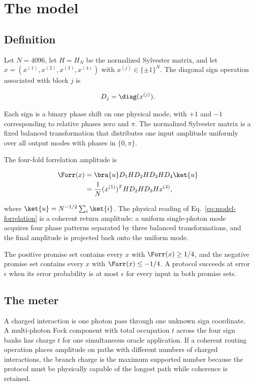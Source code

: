 \section{The model}
\label{sec:model}

\subsection{Definition}

Let $N=4096$, let $H=H_N$ be the normalized Sylvester matrix, and let $x=(x^{(1)},x^{(2)},x^{(3)},x^{(4)})$ with $x^{(j)}\in\{\pm1\}^N$. The diagonal sign operation associated with block $j$ is

\begin{equation}
D_j=\diag(x^{(j)}).
\end{equation}

Each sign is a binary phase shift on one physical mode, with $+1$ and $-1$ corresponding to relative phases zero and $\pi$. The normalized Sylvester matrix is a fixed balanced transformation that distributes one input amplitude uniformly over all output modes with phases in $\{0,\pi\}$.

The four-fold forrelation amplitude is

\begin{align}
\Forr(x)
&=\bra{u}D_1HD_2HD_3HD_4\ket{u}
\notag\\
&=\frac{1}{N}(x^{(1)})^THD_2HD_3Hx^{(4)},
\label{eq:model-forrelation}
\end{align}

where $\ket{u}=N^{-1/2}\sum_i\ket{i}$. The physical reading of Eq.~\eqref{eq:model-forrelation} is a coherent return amplitude: a uniform single-photon mode acquires four phase patterns separated by three balanced transformations, and the final amplitude is projected back onto the uniform mode.

\begin{definition}[Promise]
The positive promise set contains every $x$ with $\Forr(x)\ge1/4$, and the negative promise set contains every $x$ with $\Forr(x)\le-1/4$. A protocol succeeds at error $\epsilon$ when its error probability is at most $\epsilon$ for every input in both promise sets.
\end{definition}

\subsection{The meter}

A charged interaction is one photon pass through one unknown sign coordinate. A multi-photon Fock component with total occupation $t$ across the four sign banks has charge $t$ for one simultaneous oracle application. If a coherent routing operation places amplitude on paths with different numbers of charged interactions, the branch charge is the maximum supported number because the protocol must be physically capable of the longest path while coherence is retained.

